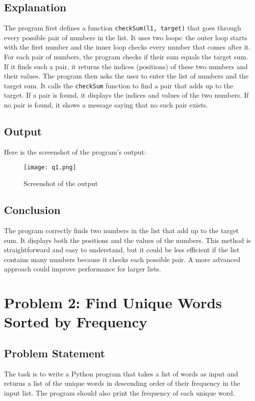 \documentclass{article}
\begin{document}
\subsection{Explanation}
The program first defines a function \texttt{checkSum(l1, target)} that goes through every possible pair of numbers in the list. It uses two loops: the outer loop starts with the first number and the inner loop checks every number that comes after it. For each pair of numbers, the program checks if their sum equals the target sum. If it finds such a pair, it returns the indices (positions) of these two numbers and their values. 
The program then asks the user to enter the list of numbers and the target sum. It calls the \texttt{checkSum} function to find a pair that adds up to the target. If a pair is found, it displays the indices and values of the two numbers. If no pair is found, it shows a message saying that no such pair exists.

\subsection{Output}
Here is the screenshot of the program's output:

\begin{figure}[h!]
    \centering
    \texttt{[image: q1.png]}  %
    \caption{Screenshot of the output}
\end{figure}

\subsection{Conclusion}
The program correctly finds two numbers in the list that add up to the target sum. It displays both the positions and the values of the numbers. This method is straightforward and easy to understand, but it could be less efficient if the list contains many numbers because it checks each possible pair. A more advanced approach could improve performance for larger lists.
\section{Problem 2: Find Unique Words Sorted by Frequency}
\subsection{Problem Statement}
The task is to write a Python program that takes a list of words as input and returns a list of the unique words in descending order of their frequency in the input list. The program should also print the frequency of each unique word.
\end{document}
